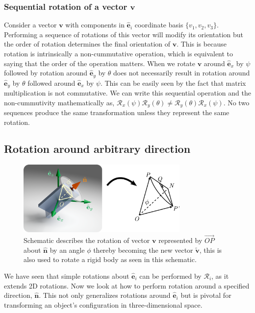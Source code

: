 \documentclass{article}
\def\nh{\hat{\mathbf{n}}}
\def\eh{\hat{\mathbf{e}}}
\def\v{\mathbf{v}}
\def\vt{\tilde{\mathbf{v}}}
\def\R{\mathcal{R}}
\def\nh{\hat{\mathbf{n}}}
\begin{document}
\subsubsection*{Sequential rotation of a vector \texorpdfstring{$\v$}{v}}
Consider a vector $\v$ with components in $\eh_i$ coordinate basis $\{ v_1, v_2, v_3 \}$. Performing a sequence of rotations of this vector will modify its orientation but the order of rotation determines the final orientation of $\v$. This is because rotation is intrinsically a non-cummutative operation, which is equivalent to saying that the order of the operation matters. When we rotate $\v$ around $\eh_x$ by $\psi$ followed by rotation around $\eh_y$ by $\theta$ does not necessarily result in rotation around $\eh_y$ by $\theta$ followed around $\eh_x$ by $\psi$. This can be easily seen by the fact that matrix multiplication is not commutative. We can write this sequential operation and the non-cummutivity mathematically as, $\R_x(\psi) \R_y(\theta) \neq \R_y(\theta) \R_x(\psi)$. No two sequences produce the same transformation unless they represent the same rotation.

\subsection{Rotation around arbitrary direction}\label{sec:rodg}
\begin{figure}[t!]
  \centering
  \includegraphics[width=0.75\textwidth]{figs/figRodg.png}
  \caption{Schematic describes the rotation of vector $\v$ represented by $\vec{OP}$ about $\nh$ by an angle $\phi$ thereby becoming the new vector $\vt$, this is also used to rotate a rigid body as seen in this schematic.}
  \label{fig:rodg}
\end{figure}
We have seen that simple rotations about $\eh_i$ can be performed by $\R_i$, as it extends 2D rotations. Now we look at how to perform rotation around a specified direction, $\nh$. This not only generalizes rotations around $\eh_i$ but is pivotal for transforming an object's configuration in three-dimensional space.
\end{document}
